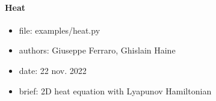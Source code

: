 \documentclass[letterpaper,10pt,english]{sphinxmanual}
\begin{document}
\paragraph{Heat}
\label{\detokenize{scrimp.examples:heat}}\begin{itemize}
\item {} 
\sphinxAtStartPar
file:             examples/heat.py

\item {} 
\sphinxAtStartPar
authors:          Giuseppe Ferraro, Ghislain Haine

\item {} 
\sphinxAtStartPar
date:             22 nov. 2022

\item {} 
\sphinxAtStartPar
brief:            2D heat equation with Lyapunov Hamiltonian

\end{itemize}
\end{document}
